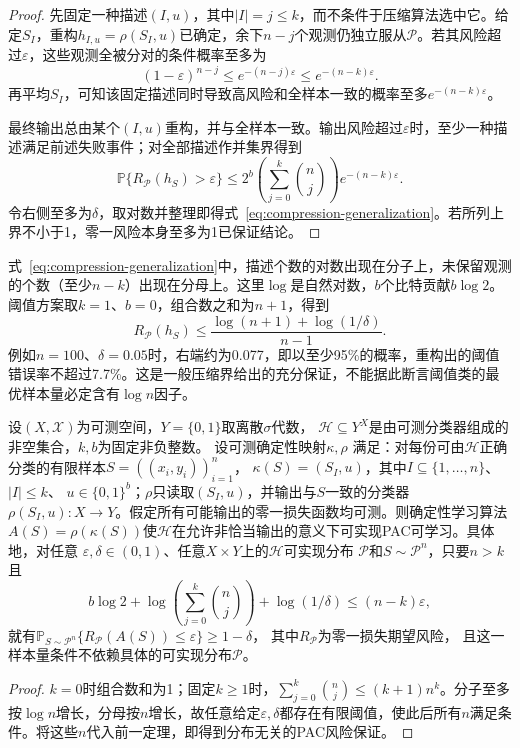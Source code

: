 \begin{proof}
先固定一种描述$(I,u)$，其中$|I|=j\leq k$，而不条件于压缩算法选中它。给定$S_I$，重构$h_{I,u}=\rho(S_I,u)$已确定，余下$n-j$个观测仍独立服从$\mathcal P$。若其风险超过$\varepsilon$，这些观测全被分对的条件概率至多为
\[
 (1-\varepsilon)^{n-j}\leq e^{-(n-j)\varepsilon}
 \leq e^{-(n-k)\varepsilon}.
\]
再平均$S_I$，可知该固定描述同时导致高风险和全样本一致的概率至多$e^{-(n-k)\varepsilon}$。

最终输出总由某个$(I,u)$重构，并与全样本一致。输出风险超过$\varepsilon$时，至少一种描述满足前述失败事件；对全部描述作并集界得到
\[
 \mathbb P\{R_{\mathcal P}(h_S)>\varepsilon\}
 \leq 2^b\left(\sum_{j=0}^k\binom nj\right)e^{-(n-k)\varepsilon}.
\]
令右侧至多为$\delta$，取对数并整理即得式~\eqref{eq:compression-generalization}。若所列上界不小于1，零一风险本身至多为1已保证结论。
\end{proof}

式~\eqref{eq:compression-generalization}中，描述个数的对数出现在分子上，未保留观测的个数（至少$n-k$）出现在分母上。这里$\log$是自然对数，$b$个比特贡献$b\log2$。阈值方案取$k=1$、$b=0$，组合数之和为$n+1$，得到
\[
 R_{\mathcal P}(h_S)\leq\frac{\log(n+1)+\log(1/\delta)}{n-1}.
\]
例如$n=100$、$\delta=0.05$时，右端约为0.077，即以至少95\%的概率，重构出的阈值错误率不超过7.7\%。这是一般压缩界给出的充分保证，不能据此断言阈值类的最优样本量必定含有$\log n$因子。

\begin{theorem}[有界样本压缩推出PAC可学习]
\label{thm:compression-pac-learning}
设$(X,\mathcal X)$为可测空间，$Y=\{0,1\}$取离散$\sigma$代数，
$\mathcal H\subseteq Y^X$是由可测分类器组成的非空集合，$k,b$为固定非负整数。
设可测确定性映射$\kappa,\rho$
满足：对每份可由$\mathcal H$正确分类的有限样本$S=((x_i,y_i))_{i=1}^n$，
$\kappa(S)=(S_I,u)$，其中$I\subseteq\{1,\ldots,n\}$、$|I|\leq k$、
$u\in\{0,1\}^b$；$\rho$只读取$(S_I,u)$，并输出与$S$一致的分类器
$\rho(S_I,u):X\to Y$。假定所有可能输出的零一损失函数均可测。则确定性学习算法
$A(S)=\rho(\kappa(S))$使$\mathcal H$在允许非恰当输出的意义下可实现PAC可学习。具体地，对任意
$\varepsilon,\delta\in(0,1)$、任意$X\times Y$上的$\mathcal H$可实现分布
$\mathcal P$和$S\sim\mathcal P^n$，只要$n>k$且
\[
 b\log2+\log\!\left(\sum_{j=0}^k\binom nj\right)+\log(1/\delta)
 \leq(n-k)\varepsilon,
\]
就有$\mathbb P_{S\sim\mathcal P^n}\{R_{\mathcal P}(A(S))\leq\varepsilon\}\geq1-\delta$，
其中$R_{\mathcal P}$为零一损失期望风险，
且这一样本量条件不依赖具体的可实现分布$\mathcal P$。
\end{theorem}

\begin{proof}
$k=0$时组合数和为1；固定$k\geq1$时，$\sum_{j=0}^k\binom nj\leq(k+1)n^k$。分子至多按$\log n$增长，分母按$n$增长，故任意给定$\varepsilon,\delta$都存在有限阈值，使此后所有$n$满足条件。将这些$n$代入前一定理，即得到分布无关的PAC风险保证。
\end{proof}

